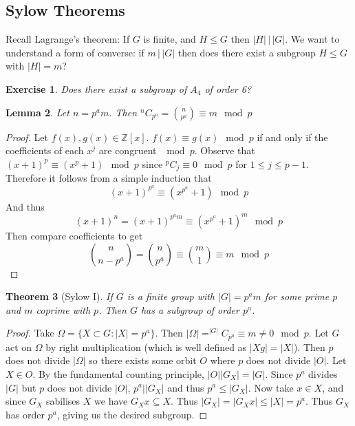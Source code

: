 \documentclass[a4paper,10pt]{article}
\newcommand{\ZZ}{\mathbb{Z}}
\newtheorem{thm}{Theorem}
\newtheorem{Ex}[thm]{Exercise}
\newtheorem{Lem}[thm]{Lemma}
\begin{document}
\subsection{Sylow Theorems}
Recall Lagrange's theorem: If $G$ is finite, and $H \leq G$ then $|H| \, \big| \, |G|$. We want to understand a form of converse: if $m \, \big| \, |G|$ then does there exist a subgroup $H \leq G$ with $|H| = m$?

\begin{Ex}
Does there exist a subgroup of $A_4$ of order 6?
\end{Ex}

\begin{Lem}
Let $n = p^a m$. Then $^nC_{p^a} = \binom{n}{p^a} \equiv m \mod p$
\end{Lem}

\begin{proof}
Let $f(x), g(x) \in \ZZ[x]$. $f(x) \equiv g(x) \mod p$ if and only if the coefficients of each $x^j$ are congruent $\mod p$. Observe that $(x + 1)^p \equiv (x^p + 1) \mod p$ since $^pC_j \equiv 0 \mod p$ for $1 \leq j \leq p-1$. Therefore it follows from a simple induction that 
\[ (x+ 1)^{p^a} \equiv (x^{p^a} + 1) \mod p \]
And thus
\[ (x+1)^n = (x+1)^{p^a m} \equiv (x^{p^a} + 1)^m \mod p \]
Then compare coefficients to get
\[ \binom{n}{n - p^a} = \binom{n}{p^a} \equiv \binom{m}{1} \equiv m \mod p \]
\end{proof}

\begin{thm}[Sylow I]
If $G$ is a finite group with $|G| = p^a m$ for some prime $p$ and $m$ coprime with $p$. Then $G$ has a subgroup of order $p^a$.
\end{thm}

\begin{proof}
Take $\Omega = \{ X \subset G : |X| = p^a \}$. Then $|\Omega| = ^{|G|}C_{p^a} \equiv m \neq 0 \mod p$. Let $G$ act on $\Omega$ by right multiplication (which is well defined as $|Xg| = |X|$). Then $p$ does not divide $|\Omega|$ so there exists some orbit $O$ where $p$ does not divide $|O|$. Let $X \in O$. By the fundamental counting principle, $|O| |G_X| = |G|$. Since $p^a$ divides $|G|$ but $p$ does not divide $|O|$, $p^a | |G_X|$ and thus $p^a \leq |G_X|$. Now take $x \in X$, and since $G_X$ sabilises $X$ we have $G_X x \subseteq X$. Thus $|G_X| = |G_X x| \leq |X| = p^a$. Thus $G_X$ has order $p^a$, giving us the desired subgroup.
\end{proof}
\end{document}
